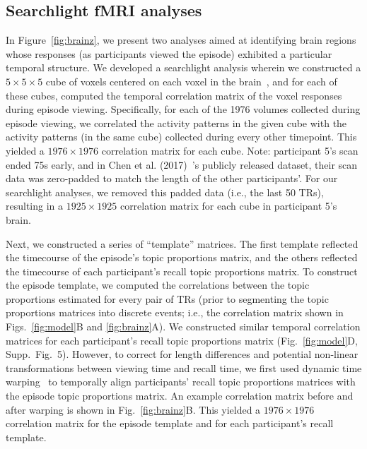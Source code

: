 \documentclass[10pt]{article}
\newcommand{\corrmats}{5}
\begin{document}
\subsection*{Searchlight fMRI analyses}
In Figure~\ref{fig:brainz}, we present two analyses aimed at identifying brain regions whose responses (as participants viewed the episode) exhibited a particular temporal structure.  We developed a searchlight analysis wherein we constructed a $5 \times 5 \times 5$ cube of voxels centered on each voxel in the brain~\citep{ChenEtal17}, and for each of these cubes, computed the temporal correlation matrix of the voxel responses during episode viewing.  Specifically, for each of the 1976 volumes collected during episode viewing, we correlated the activity patterns in the given cube with the activity patterns (in the same cube) collected during every other timepoint.  This yielded a $1976 \times 1976$ correlation matrix for each cube.  Note: participant 5's scan ended 75s early, and in Chen et al. (2017)~\cite{ChenEtal17}'s publicly released dataset, their scan data was zero-padded to match the length of the other participants'.  For our searchlight analyses, we removed this padded data (i.e., the last 50 TRs), resulting in a $1925 \times 1925$ correlation matrix for each cube in participant 5's brain.

Next, we constructed a series of ``template'' matrices.  The first template reflected the timecourse of the episode's topic proportions matrix, and the others reflected the timecourse of each participant's recall topic proportions matrix.  To construct the episode template, we computed the correlations between the topic proportions estimated for every pair of TRs (prior to segmenting the topic proportions matrices into discrete events; i.e., the correlation matrix shown in Figs.~\ref{fig:model}B and \ref{fig:brainz}A).  We constructed similar temporal correlation matrices for each participant's recall topic proportions matrix (Fig.~\ref{fig:model}D, Supp.\ Fig.~\corrmats).  However, to correct for length differences and potential non-linear transformations between viewing time and recall time, we first used dynamic time warping~\citep{BernClif94} to temporally align participants' recall topic proportions matrices with the episode topic proportions matrix.  An example correlation matrix before and after warping is shown in Fig.~\ref{fig:brainz}B.  This yielded a $1976 \times 1976$ correlation matrix for the episode template and for each participant's recall template.
\end{document}
